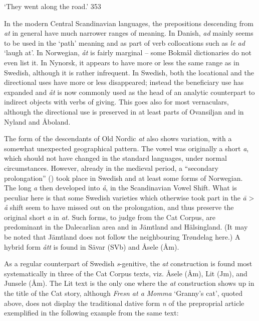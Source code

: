 \begin{styleTranslation}
‘They went along the road.’ 353

\end{styleTranslation}

\begin{styleBodyTextFirst}
In the modern Central Scandinavian languages, the prepositions descending from \textit{at} in general have much narrower ranges of meaning. In Danish, \textit{ad }mainly seems to be used in the ‘path’ meaning and as part of verb collocations such as \textit{le ad} ‘laugh at’. In Norwegian, \textit{åt} is fairly marginal – some Bokmål dictionaries do not even list it. In Nynorsk, it appears to have more or less the same range as in Swedish, although it is rather infrequent. In Swedish, both the locational and the directional uses have more or less disappeared; instead the beneficiary use has expanded and \textit{åt }is now commonly used as the head of an analytic counterpart to indirect objects with verbs of giving. This goes also for most vernaculars, although the directional use is preserved in at least parts of Ovansiljan and in Nyland and Åboland. 

\end{styleBodyTextFirst}

\begin{styleBodytextC}
The form of the descendants of Old Nordic \textit{at} also shows variation, with a somewhat unexpected geographical pattern. The vowel was originally a short \textit{a}, which should not have changed in the standard languages, under normal circumstances. However, already in the medieval period, a “secondary prolongation” (\citet[1204]{Hellquist1922}) took place in Swedish and at least some forms of Norwegian. The long \textit{a} then developed into \textit{å}, in the Scandinavian Vowel Shift. What is peculiar here is that some Swedish varieties which otherwise took part in the \textit{\=a }{\textgreater} \textit{å} shift seem to have missed out on the prolongation, and thus preserve the original short \textit{a }in\textit{ at.} Such forms, to judge from the Cat Corpus, are predominant in the Dalecarlian area and in Jämtland and Hälsingland. (It may be noted that Jämtland does not follow the neighbouring Trøndelag here.) A hybrid form \textit{ått} is found in Sävar (SVb) and Åsele (Åm). 

\end{styleBodytextC}

\begin{styleBodytextC}
As a regular counterpart of Swedish \textit{s}{}-genitive, the \textit{at} construction is found most systematically in three of the Cat Corpus texts, viz. Åsele (Åm), Lit (Jm), and Junsele (Åm). The Lit text is the only one where the \textit{at} construction shows up in the title of the Cat story, although \textit{Fresn at a Momma }‘Granny’s cat’, quoted above, does not display the traditional dative form \textit{n} of the preproprial article exemplified in the following example from the same text:

\end{styleBodytextC}


